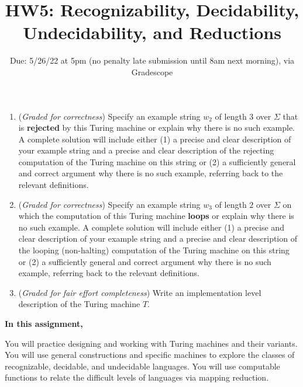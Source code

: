 \begin{enumerate}
\begin{enumerate}
        {\it Hint:} In class we've drawn pictures to represent the configuration of the machine at each step 
        in a computation.  You may do so or you may choose to describe these configurations in words.
        
        \item ({\it Graded for correctness}) Specify an example string $w_2$ of length $3$ over $\Sigma$ 
        that is {\bf rejected} by this Turing machine
        or explain why there is no such 
        example. A complete solution will include either (1) a precise and clear 
        description of your example  string and a precise and clear description of the rejecting computation
        of the Turing machine on this string or (2) a sufficiently
        general and correct argument why there is no such example, referring back to the relevant definitions.

        \item ({\it Graded for correctness}) Specify an example string $w_3$ of length $2$ over $\Sigma$ 
        on which  the computation of this Turing machine {\bf loops}
        or explain why there is no such 
        example. A complete solution will include either (1) a precise and clear 
        description of your example  string and a precise and clear description of the looping (non-halting) 
        computation
        of the Turing machine on this string or (2) a sufficiently
        general and correct argument why there is no such example, referring back to the relevant definitions.

        \item ({\it Graded for fair effort completeness}) Write an implementation level description of 
        the Turing machine $T$.
\end{enumerate}

\end{enumerate}
\newpage

\title{HW5: Recognizability, Decidability, Undecidability, and Reductions}
\date{Due: 5/26/22 at 5pm (no penalty late submission until 8am next morning), via Gradescope}


\maketitle
\thispagestyle{fancy}

{\bf In this assignment,}

You will practice designing and working with Turing machines and their variants. 
You will use general constructions and specific machines to explore the classes of recognizable, 
decidable, and undecidable languages.
You will use computable functions to relate the difficult levels of languages via mapping reduction.

